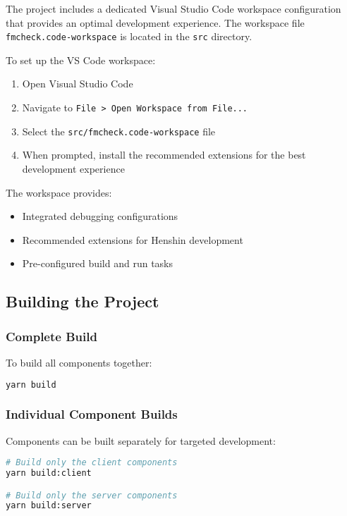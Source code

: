 The project includes a dedicated Visual Studio Code workspace configuration that provides an optimal development experience. The workspace file \texttt{fmcheck.code-workspace} is located in the \texttt{src} directory.

To set up the VS Code workspace:

\begin{enumerate}
    \item Open Visual Studio Code
    \item Navigate to \texttt{File > Open Workspace from File...}
    \item Select the \texttt{src/fmcheck.code-workspace} file
    \item When prompted, install the recommended extensions for the best development experience
\end{enumerate}

The workspace provides:
\begin{itemize}
    \item Integrated debugging configurations
    \item Recommended extensions for Henshin development
    \item Pre-configured build and run tasks
\end{itemize}

\subsection{Building the Project}
\label{subsec:building}

\subsubsection{Complete Build}

To build all components together:

\begin{lstlisting}[language=bash]
yarn build
\end{lstlisting}

\subsubsection{Individual Component Builds}

Components can be built separately for targeted development:

\begin{lstlisting}[language=bash]
# Build only the client components
yarn build:client

# Build only the server components  
yarn build:server
\end{lstlisting}

